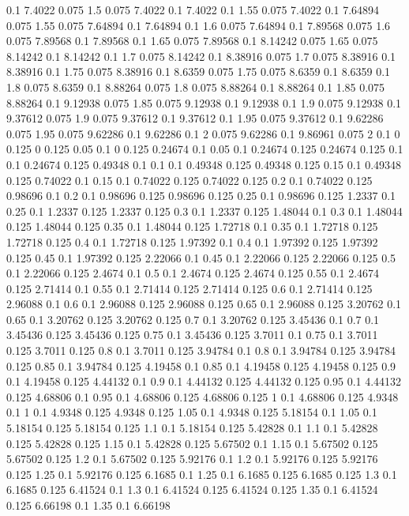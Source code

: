0.1 7.4022
0.075 1.5
0.075 7.4022
0.1 7.4022
0.1 1.55
0.075 7.4022
0.1 7.64894
0.075 1.55
0.075 7.64894
0.1 7.64894
0.1 1.6
0.075 7.64894
0.1 7.89568
0.075 1.6
0.075 7.89568
0.1 7.89568
0.1 1.65
0.075 7.89568
0.1 8.14242
0.075 1.65
0.075 8.14242
0.1 8.14242
0.1 1.7
0.075 8.14242
0.1 8.38916
0.075 1.7
0.075 8.38916
0.1 8.38916
0.1 1.75
0.075 8.38916
0.1 8.6359
0.075 1.75
0.075 8.6359
0.1 8.6359
0.1 1.8
0.075 8.6359
0.1 8.88264
0.075 1.8
0.075 8.88264
0.1 8.88264
0.1 1.85
0.075 8.88264
0.1 9.12938
0.075 1.85
0.075 9.12938
0.1 9.12938
0.1 1.9
0.075 9.12938
0.1 9.37612
0.075 1.9
0.075 9.37612
0.1 9.37612
0.1 1.95
0.075 9.37612
0.1 9.62286
0.075 1.95
0.075 9.62286
0.1 9.62286
0.1 2
0.075 9.62286
0.1 9.86961
0.075 2
0.1 0
0.125 0
0.125 0.05
0.1 0
0.125 0.24674
0.1 0.05
0.1 0.24674
0.125 0.24674
0.125 0.1
0.1 0.24674
0.125 0.49348
0.1 0.1
0.1 0.49348
0.125 0.49348
0.125 0.15
0.1 0.49348
0.125 0.74022
0.1 0.15
0.1 0.74022
0.125 0.74022
0.125 0.2
0.1 0.74022
0.125 0.98696
0.1 0.2
0.1 0.98696
0.125 0.98696
0.125 0.25
0.1 0.98696
0.125 1.2337
0.1 0.25
0.1 1.2337
0.125 1.2337
0.125 0.3
0.1 1.2337
0.125 1.48044
0.1 0.3
0.1 1.48044
0.125 1.48044
0.125 0.35
0.1 1.48044
0.125 1.72718
0.1 0.35
0.1 1.72718
0.125 1.72718
0.125 0.4
0.1 1.72718
0.125 1.97392
0.1 0.4
0.1 1.97392
0.125 1.97392
0.125 0.45
0.1 1.97392
0.125 2.22066
0.1 0.45
0.1 2.22066
0.125 2.22066
0.125 0.5
0.1 2.22066
0.125 2.4674
0.1 0.5
0.1 2.4674
0.125 2.4674
0.125 0.55
0.1 2.4674
0.125 2.71414
0.1 0.55
0.1 2.71414
0.125 2.71414
0.125 0.6
0.1 2.71414
0.125 2.96088
0.1 0.6
0.1 2.96088
0.125 2.96088
0.125 0.65
0.1 2.96088
0.125 3.20762
0.1 0.65
0.1 3.20762
0.125 3.20762
0.125 0.7
0.1 3.20762
0.125 3.45436
0.1 0.7
0.1 3.45436
0.125 3.45436
0.125 0.75
0.1 3.45436
0.125 3.7011
0.1 0.75
0.1 3.7011
0.125 3.7011
0.125 0.8
0.1 3.7011
0.125 3.94784
0.1 0.8
0.1 3.94784
0.125 3.94784
0.125 0.85
0.1 3.94784
0.125 4.19458
0.1 0.85
0.1 4.19458
0.125 4.19458
0.125 0.9
0.1 4.19458
0.125 4.44132
0.1 0.9
0.1 4.44132
0.125 4.44132
0.125 0.95
0.1 4.44132
0.125 4.68806
0.1 0.95
0.1 4.68806
0.125 4.68806
0.125 1
0.1 4.68806
0.125 4.9348
0.1 1
0.1 4.9348
0.125 4.9348
0.125 1.05
0.1 4.9348
0.125 5.18154
0.1 1.05
0.1 5.18154
0.125 5.18154
0.125 1.1
0.1 5.18154
0.125 5.42828
0.1 1.1
0.1 5.42828
0.125 5.42828
0.125 1.15
0.1 5.42828
0.125 5.67502
0.1 1.15
0.1 5.67502
0.125 5.67502
0.125 1.2
0.1 5.67502
0.125 5.92176
0.1 1.2
0.1 5.92176
0.125 5.92176
0.125 1.25
0.1 5.92176
0.125 6.1685
0.1 1.25
0.1 6.1685
0.125 6.1685
0.125 1.3
0.1 6.1685
0.125 6.41524
0.1 1.3
0.1 6.41524
0.125 6.41524
0.125 1.35
0.1 6.41524
0.125 6.66198
0.1 1.35
0.1 6.66198
